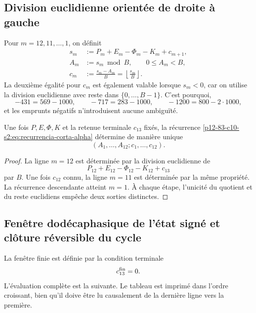 \subsection{Division euclidienne orientée de droite à gauche}

Pour \(m=12,11,\ldots,1\), on définit
\begin{equation}
\begin{aligned}
 s_m&:=P_m+E_m-\Phi_m-K_m+c_{m+1},\\
 A_m&:=s_m\bmod B,
       \qquad 0\leq A_m<B,\\
 c_m&:=\frac{s_m-A_m}{B}
      =\left\lfloor\frac{s_m}{B}\right\rfloor .
\end{aligned}
\label{p12-83-c10-s2:eq:recurrencia-corta-alpha}
\end{equation}
La deuxième égalité pour \(c_m\) est également valable lorsque \(s_m<0\),
car on utilise la division euclidienne avec reste dans
\(\{0,\ldots,B-1\}\). C'est pourquoi,
\[
 -431=569-1000,
 \qquad
 -717=283-1000,
 \qquad
 -1200=800-2\cdot1000,
\]
et les emprunts négatifs n’introduisent aucune ambiguïté.

\begin{theorem}
\label{p12-83-c10-s2:thm:unicidad-acarreo-orientado-alpha}
Une fois \(P,E,\Phi,K\) et la retenue terminale \(c_{13}\) fixés, la récurrence
\eqref{p12-83-c10-s2:eq:recurrencia-corta-alpha} détermine de manière unique
\[
 (A_1,\ldots,A_{12};c_1,\ldots,c_{12}).
\]
\end{theorem}

\begin{proof}
La ligne \(m=12\) est déterminée par la division euclidienne de
\[
 P_{12}+E_{12}-\Phi_{12}-K_{12}+c_{13}
\]
par \(B\). Une fois \(c_{12}\) connu, la ligne \(m=11\) est déterminée par
la même propriété. La récurrence descendante atteint \(m=1\). À chaque
étape, l’unicité du quotient et du reste euclidiens empêche deux sorties
distinctes.
\end{proof}

\subsection{Fenêtre dodécaphasique de l'état signé et clôture réversible du cycle}

La fenêtre finie est définie par la condition terminale
\[
 c_{13}^{\rm fin}=0.
\]
L’évaluation complète est la suivante. Le tableau est imprimé dans l’ordre
croissant, bien qu’il doive être lu causalement de la dernière ligne vers la
première.

